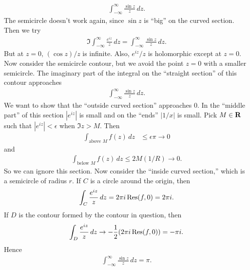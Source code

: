 \documentclass[11pt, oneside,margin=1in]{article}
\begin{document}
\begin{example}[ ]\label{}\text{}
\begin{align*}
	\int_{-\infty}^{\infty} \frac{\sin z}{z}  \, dz. 
\end{align*}
The semicircle doesn't work again, since $\sin z$ is ``big'' on the curved section. Then we try
\begin{align*}
	\Im \int_{-\infty}^{\infty} \frac{e^{iz}}{z}  \, dz =  \int_{-\infty}^{\infty} \frac{\sin z}{z}  \, dz. 
\end{align*}
But at $z=0$, $(\cos z) /z$ is infinite. Also, $e^{iz}/z$ is holomorphic except at $z=0$. Now consider the semicircle contour, but we avoid the point $z=0$ with a smaller semicircle. The imaginary part of the integral on the ``straight section'' of this contour approaches
\begin{align*}
 \int_{-\infty}^{\infty} \frac{\sin z}{z}  \, dz. 
\end{align*}
We want to show that the ``outside curved section'' approaches $0$. In the ``middle part'' of this section $\left\lvert e^{iz} \right\rvert $ is small and on the ``ends'' $\left\lvert 1/x \right\rvert $ is small. Pick $M\in \mathbf R$ such that $\left\lvert e^{iz} \right\rvert <\epsilon$ when $\Im z > M$. Then
\begin{align*}
	\int_{\textrm{above $M$}}^{} f(z)  \, dz &\le \epsilon \pi\to 0
\end{align*}
and 
\begin{align*}
	\int_{\textrm{below $M$}}^{} f(z)  \, dz \le 2M(1/R) \to 0. 
\end{align*}
So we can ignore this section. Now consider the ``inside curved section,'' which is a semicircle of radius $r$. If $C$ is a circle around the origin, then
\begin{align*}
	\int_{C}^{} \frac{e^{iz}}{z}  \, dz = 2\pi i \operatorname{Res}(f,0) = 2\pi i. 
\end{align*}
If $D$ is the contour formed by the contour in question, then
\begin{align*}
	\int_{D}^{} \frac{e^{iz}}{z}  \, dz \to -\frac{1}{2} (2\pi i \operatorname{Res}(f,0)) = -\pi i.
\end{align*}
Hence 
\begin{align*}
\int_{-\infty}^{\infty} \frac{\sin z}{z}  \, dz = \pi. 	
\end{align*}
\end{example}
\end{document}
